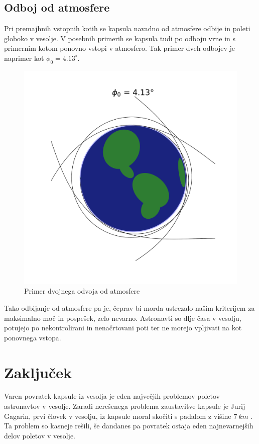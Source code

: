 \documentclass[11pt,a4paper]{article}
\begin{document}
\subsection{Odboj od atmosfere}

Pri premajhnih vstopnih kotih se kapsula navadno od atmosfere odbije in poleti globoko v vesolje. V posebnih primerih se kapsula tudi po odboju vrne in s primernim kotom ponovno vstopi v atmosfero. Tak primer dveh odbojev je naprimer kot $ \phi_0 = 4.13^\circ $.

\begin{figure}[H]
	\begin{center}
		\includegraphics[width=12cm]{4_13_scheme.pdf}
		\caption{Primer dvojnega odvoja od atmosfere}
	\end{center}
\end{figure}

Tako odbijanje od atmosfere pa je, \v ceprav bi morda ustrezalo na\v sim kriterijem za maksimalno mo\v c in pospe\v sek, zelo nevarno. Astronavti so dlje \v casa v vesolju, potujejo po nekontrolirani in nena\v crtovani poti ter ne morejo vpljivati na kot ponovnega vstopa.
\clearpage

\section{Zaklju\v cek}
Varen povratek kapsule iz vesolja je eden najve\v cjih problemov poletov astronavtov v vesolje. Zaradi nere\v senega problema zaustavitve kapsule je Jurij Gagarin, prvi \v clovek v vesolju, iz kapsule moral sko\v citi s padalom z vi\v sine $ 7\ km $ \cite{vostok-1-wiki}. Ta problem so kasneje re\v sili, \v se dandanes pa povratek ostaja eden najnevarnej\v sih delov poletov v vesolje.
\end{document}
